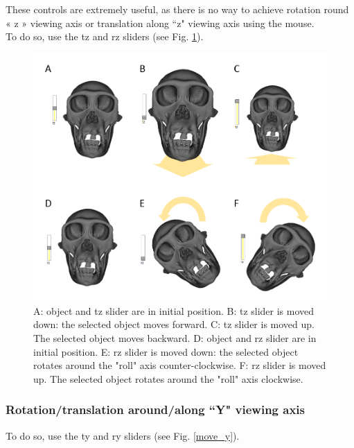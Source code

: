 These controls are extremely useful, as there is no way to achieve rotation round « z » viewing axis or translation along ``z" viewing axis using the
mouse. \\ To do so, use the tz and rz sliders (see Fig. \ref{move_z}).


\begin{figure}
  \centering
  \includegraphics[scale=0.45]{images/06/objects/move_objects_z.png} 
	\caption{A: object and tz slider are in initial position. B: tz slider is moved down: the selected object moves forward. C: tz slider is moved up. The selected object moves backward. D: object and rz slider are in initial position. E: rz slider is moved down: the selected object rotates around the "roll" axis counter-clockwise. F: rz slider is moved up. The selected object rotates around the "roll" axis clockwise.}
\label{move_z}
 
\end{figure}



\subsubsection{Rotation/translation around/along ``Y" viewing axis}

To do so, use the ty and ry sliders (see Fig. \ref{move_y}).


